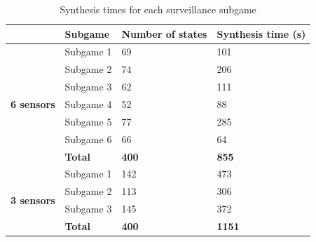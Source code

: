 \begin{table}[h!]
	\centering
	\caption{Synthesis times for each surveillance subgame}
	\label{tab:synthtime}
	\begin{tabular}{c|l|l|l}
		\multicolumn{1}{l|}{}                                    & \textbf{Subgame} & \textbf{Number of states} & \textbf{Synthesis time (s)} \\ \hline \hline
		\multirow{7}{*}{\textbf{6 sensors}}
		& Subgame 1   & 69     & 101                          \\
	    & Subgame 2   & 74     & 206                          \\
		& Subgame 3   & 62     & 111                          \\
		& Subgame 4   & 52     & 88                          \\
		& Subgame 5   & 77     & 285                          \\
		& Subgame 6   & 66     & 64                          \\ \hline
		& \textbf{Total}   & \textbf{400}         & \textbf{855}                         \\ \hline
		\multicolumn{1}{l|}{\multirow{4}{*}{\textbf{3 sensors}}} & Subgame 1        & 142 & 473                         \\
		\multicolumn{1}{l|}{}                                    & Subgame 2        & 113 & 306                         \\
		\multicolumn{1}{l|}{}                                    & Subgame 3        & 145 & 372                         \\ \hline
		\multicolumn{1}{l|}{}                                    &  \textbf{Total} & \textbf{400}            & \textbf{1151}                        
	\end{tabular}
\end{table}

